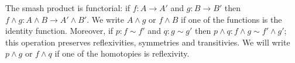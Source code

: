 \documentclass{article}
\newcommand{\pmap}{\to}
\newcommand{\smsh}{\wedge}
\renewcommand{\o}{\ensuremath{\circ}}
\begin{document}
\begin{lem}\label{lem:smash-general}
	The smash product is functorial: if $f:A\pmap A'$ and $g:B\pmap B'$ then
    $f\smsh g:A\smsh B\pmap A'\smsh B'$. We write $A\smsh g$ or $f\smsh B$ if one of the
    functions is the identity function. Moreover, if $p:f\sim f'$ and $q:g\sim g'$ then $p\smsh q:f\smsh g\sim f'\smsh g'$; this operation preserves reflexivities, symmetries and transitivies. We will write $p \smsh g$ or $f \smsh q$ if one of the homotopies is reflexivity.
\end{lem}
\end{document}
